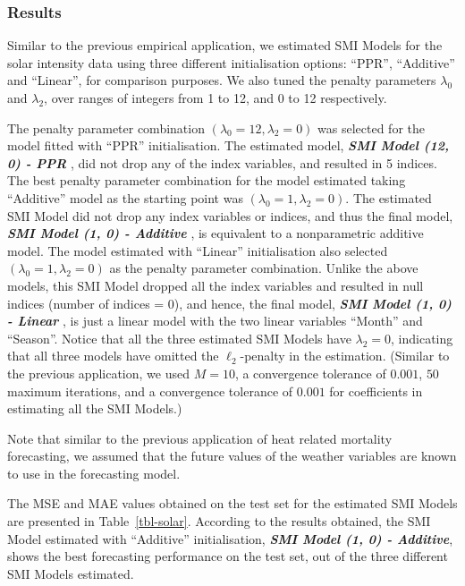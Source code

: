 \documentclass[11pt,a4paper,]{article}
\begin{document}
\hypertarget{results-1}{%
\subsubsection{Results}\label{results-1}}

Similar to the previous empirical application, we estimated SMI Models
for the solar intensity data using three different initialisation
options: ``PPR'', ``Additive'' and ``Linear'', for comparison purposes.
We also tuned the penalty parameters \(\lambda_{0}\) and
\(\lambda_{2}\), over ranges of integers from 1 to 12, and 0 to 12
respectively.

The penalty parameter combination
\((\lambda_{0} = 12, \lambda_{2} = 0)\) was selected for the model
fitted with ``PPR'' initialisation. The estimated model,
\textbf{\emph{SMI Model (12, 0) - PPR }}, did not drop any of the index
variables, and resulted in 5 indices. The best penalty parameter
combination for the model estimated taking ``Additive'' model as the
starting point was \((\lambda_{0} = 1, \lambda_{2} = 0)\). The estimated
SMI Model did not drop any index variables or indices, and thus the
final model, \textbf{\emph{SMI Model (1, 0) - Additive }}, is equivalent
to a nonparametric additive model. The model estimated with ``Linear''
initialisation also selected \((\lambda_{0} = 1, \lambda_{2} = 0)\) as
the penalty parameter combination. Unlike the above models, this SMI
Model dropped all the index variables and resulted in null indices
(number of indices = 0), and hence, the final model, \textbf{\emph{SMI
Model (1, 0) - Linear }}, is just a linear model with the two linear
variables ``Month'' and ``Season''. Notice that all the three estimated
SMI Models have \(\lambda_{2} = 0\), indicating that all three models
have omitted the \(\ell_{2}\)-penalty in the estimation. (Similar to the
previous application, we used \(M = 10\), a convergence tolerance of
\(0.001\), \(50\) maximum iterations, and a convergence tolerance of
\(0.001\) for coefficients in estimating all the SMI Models.)

Note that similar to the previous application of heat related mortality
forecasting, we assumed that the future values of the weather variables
are known to use in the forecasting model.

The MSE and MAE values obtained on the test set for the estimated SMI
Models are presented in Table~\ref{tbl-solar}. According to the results
obtained, the SMI Model estimated with ``Additive'' initialisation,
\textbf{\emph{SMI Model (1, 0) - Additive}}, shows the best forecasting
performance on the test set, out of the three different SMI Models
estimated.
\end{document}
